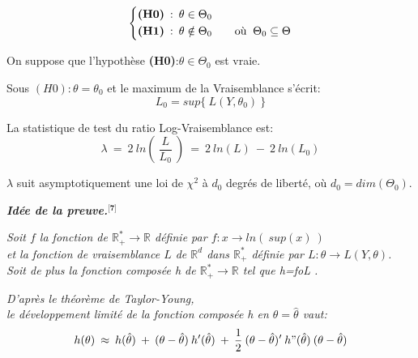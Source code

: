 \documentclass[12pt,fleqn]{book} %
\begin{document}
\vspace{1em}

\begin{equation*}
\left\{\begin{aligned} & \textbf{(H0)} \: : \: \theta\in\Theta_0 \\
 & \textbf{(H1)} \: : \: \theta \notin \Theta_0 
 \qquad \textnormal{où }\: \Theta_0 \subseteq \Theta \end{aligned}\right. 
\end{equation*}

\vspace{2em} 

On suppose que l'hypothèse \textbf{(H0)}\::\:$\theta\in\Theta_0$ est vraie.

\vspace{1em}

Sous $(H0): \theta=\theta_0$ et le maximum de la Vraisemblance s'écrit:
\[
L_0=sup\{\:L(Y,\theta_0)\:\} 
\]

\vspace{2em}

La statistique de test du ratio Log-Vraisemblance est:
\[
\lambda\:=\:2\:ln\left(\:
\frac{L}{L_0}
\:\right) \:=\: 2\:ln(L)\:-\: 2\:ln(L_0)
\]

\vspace{1em}

$\lambda$ suit asymptotiquement une loi de $\chi^2$ à $d_0$ degrés de liberté, où $d_0=dim(\Theta_0)$.

\vspace{0.5em}

\textbf{\textit{Idée de la preuve.$^\textbf{[7]}$}}

\vspace{0.5em}

\textit{
Soit $f$ la fonction de $\mathbb{R}_{+}^{*}\rightarrow\mathbb{R}$ définie par $f:x\rightarrow ln(\:sup(x)\:)$\\ et la fonction de vraisemblance $L$ de $\mathbb{R}^{d}$ dans $\mathbb{R}_{+}^{*}$ définie par $L:\theta \rightarrow L(Y,\theta)$.\\ 
Soit de plus la fonction composée h de $\mathbb{R}_{+}^{*}\rightarrow\mathbb{R}$ tel que h\:=\:f\:o\:L .}

\vspace{1em}

\textit{D'après le théorème de Taylor-Young,\\ 
le développement limité de la fonction composée h en $\theta=\hat{\theta}$ vaut:}\\
\[ 
h(\theta)\:\approx\:h(\hat{\theta})\:+\:(\theta-\hat{\theta})\:h'(\hat{\theta})\:+\: \frac{1}{2} \:(\theta-\hat{\theta})'\:h"(\hat{\theta})\:(\theta-\hat{\theta})
\]
\end{document}
